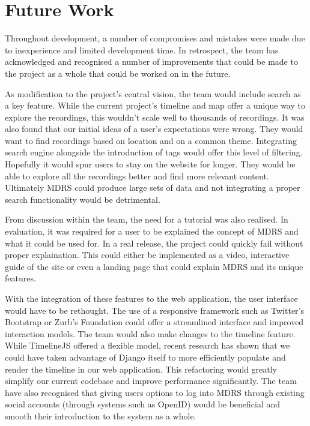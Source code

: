 \documentclass{l3proj}
\begin{document}
\chapter{Future Work}
\label{Future Work}

Throughout development, a number of compromises and mistakes were made due to inexperience and limited development time. In retrospect, the team has acknowledged and recognised a number of improvements that could be made to the project as a whole that could be worked on in the future.

As modification to the project's central vision, the team would include search as a key feature. While the current project's timeline and map offer a unique way to explore the recordings, this wouldn't scale well to thousands of recordings. It was also found that our initial ideas of a user's expectations were wrong. They would want to find recordings based on location and on a common theme. Integrating search engine alongside the introduction of tags would offer this level of filtering. Hopefully it would spur users to stay on the website for longer. They would be able to explore all the recordings better and find more relevant content. Ultimately MDRS could produce large sets of data and not integrating a proper search functionality would be detrimental.

From discussion within the team, the need for a tutorial was also realised. In evaluation, it was required for a user to be explained the concept of MDRS and what it could be used for. In a real release, the project could quickly fail without proper explaination. This could either be implemented as a video, interactive guide of the site or even a landing page that could explain MDRS and its unique features.

With the integration of these features to the web application, the user interface would have to be rethought. The use of a responsive framework such as Twitter's Bootstrap or Zurb's Foundation could offer a streamlined interface and improved interaction models. The team would also make changes to the timeline feature. While TimelineJS offered a flexible model, recent research has shown that we could have taken advantage of Django itself to more efficiently populate and render the timeline in our web application. This refactoring would greatly simplify our current codebase and improve performance significantly. The team have also recognised that giving users options to log into MDRS through existing social accounts (through systems such as OpenID) would be beneficial and smooth their introduction to the system as a whole.
\end{document}
